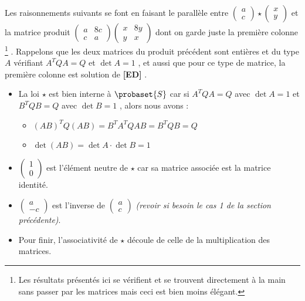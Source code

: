 \medskip

Les raisonnements suivants se font en faisant le parallèle entre 
$\begin{pmatrix} 
  a \\ 
  c 
\end{pmatrix}
\star
\begin{pmatrix} 
  x \\ 
  y 
\end{pmatrix}$
et la matrice produit
$\begin{pmatrix} 
  a & 8c \\ 
  c & a 
\end{pmatrix}
\begin{pmatrix} 
  x & 8y \\ 
  y & x 
\end{pmatrix}$
dont on garde juste la première colonne
\footnote{
	Les résultats présentés ici se vérifient et se trouvent directement à la main sans passer par les matrices mais ceci est bien moins élégant.
} .
Rappelons que les deux matrices du produit précédent sont entières et du type $A$ vérifiant $A^T Q A = Q$ et $\det A = 1$ , et aussi que pour ce type de matrice, la première colonne est solution de \textbf{[ED]} .


\begin{itemize}[label=\small\textbullet]
	\item La loi $\star$ est bien interne à $\probaset{S}$ car si $A^T Q A = Q$ avec $\det A = 1$ et $B^T Q B = Q$ avec $\det B = 1$ , alors nous avons :
	
	\begin{itemize}[label=\raisebox{.3ex}{$\centerdot$}]
		\item $(AB)^T Q (AB) = B^T A^T Q A B = B^T Q B = Q$
		
		\medskip
		\item $\det(AB) = \det A \cdot \det B = 1$
	\end{itemize}


	\medskip
	\item
	$\begin{pmatrix} 
	  1 \\ 
	  0 
	\end{pmatrix}$
	est l'élément neutre de $\star$ car sa matrice associée est la matrice identité.


	\medskip
	\item
	$\begin{pmatrix} 
	  a  \\ 
	  -c 
	\end{pmatrix}$
	est l'inverse de
	$\begin{pmatrix} 
	  a \\ 
	  c 
	\end{pmatrix}$
	\textit{(revoir si besoin le cas 1 de la section précédente)}.


	\medskip
	\item Pour finir, l'associativité de $\star$ découle de celle de la multiplication des matrices.
\end{itemize}
